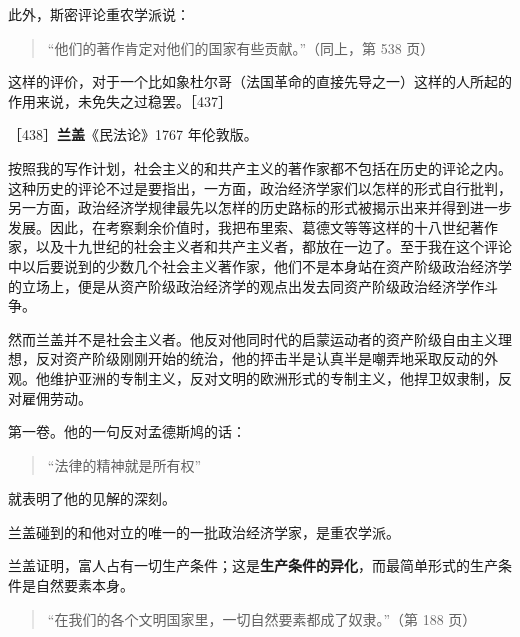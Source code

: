 此外，斯密评论重农学派说：

\begin{quote}“他们的著作肯定对他们的国家有些贡献。”（同上，第 538 页）\end{quote}

这样的评价，对于一个比如象杜尔哥（法国革命的直接先导之一）这样的人所起的作用来说，未免失之过稳罢。［437］



［438］\textbf{兰盖}《民法论》1767 年伦敦版。

按照我的写作计划，社会主义的和共产主义的著作家都不包括在历史的评论之内。这种历史的评论不过是要指出，一方面，政治经济学家们以怎样的形式自行批判，另一方面，政治经济学规律最先以怎样的历史路标的形式被揭示出来并得到进一步发展。因此，在考察剩余价值时，我把布里索、葛德文等等这样的十八世纪著作家，以及十九世纪的社会主义者和共产主义者，都放在一边了。至于我在这个评论中以后要说到的少数几个社会主义著作家，他们不是本身站在资产阶级政治经济学的立场上，便是从资产阶级政治经济学的观点出发去同资产阶级政治经济学作斗争。

然而兰盖并不是社会主义者。他反对他同时代的启蒙运动者的资产阶级自由主义理想，反对资产阶级刚刚开始的统治，他的抨击半是认真半是嘲弄地采取反动的外观。他维护亚洲的专制主义，反对文明的欧洲形式的专制主义，他捍卫奴隶制，反对雇佣劳动。

第一卷。他的一句反对孟德斯鸠的话：

\begin{quote}“法律的精神就是所有权”\end{quote}

就表明了他的见解的深刻。

兰盖碰到的和他对立的唯一的一批政治经济学家，是重农学派。

兰盖证明，富人占有一切生产条件；这是\textbf{生产条件的异化}，而最简单形式的生产条件是自然要素本身。

\begin{quote}“在我们的各个文明国家里，一切自然要素都成了奴隶。”（第 188 页）\end{quote}

